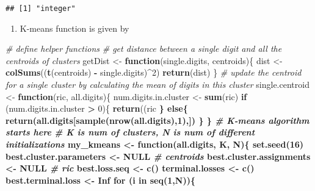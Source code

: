 \documentclass[]{article}
\newenvironment{Shaded}{\begin{snugshade}}{\end{snugshade}}
\newcommand{\KeywordTok}[1]{\textcolor[rgb]{0.13,0.29,0.53}{\textbf{#1}}}
\newcommand{\DecValTok}[1]{\textcolor[rgb]{0.00,0.00,0.81}{#1}}
\newcommand{\StringTok}[1]{\textcolor[rgb]{0.31,0.60,0.02}{#1}}
\newcommand{\CommentTok}[1]{\textcolor[rgb]{0.56,0.35,0.01}{\textit{#1}}}
\newcommand{\OtherTok}[1]{\textcolor[rgb]{0.56,0.35,0.01}{#1}}
\newcommand{\ControlFlowTok}[1]{\textcolor[rgb]{0.13,0.29,0.53}{\textbf{#1}}}
\newcommand{\OperatorTok}[1]{\textcolor[rgb]{0.81,0.36,0.00}{\textbf{#1}}}
\newcommand{\NormalTok}[1]{#1}
\providecommand{\tightlist}{%
  \setlength{\itemsep}{0pt}\setlength{\parskip}{0pt}}
\begin{document}
\begin{verbatim}
## [1] "integer"
\end{verbatim}

\begin{enumerate}
\def\labelenumi{\arabic{enumi}.}
\setcounter{enumi}{1}
\tightlist
\item
  K-means function is given by
\end{enumerate}

\begin{Shaded}
\begin{Highlighting}[]
\CommentTok{# define helper functions}
\CommentTok{# get distance between a single digit and all the centroids of clusters}
\NormalTok{getDist <-}\StringTok{ }\ControlFlowTok{function}\NormalTok{(single.digits, centroids)\{}
\NormalTok{  dist <-}\StringTok{ }\KeywordTok{colSums}\NormalTok{((}\KeywordTok{t}\NormalTok{(centroids) }\OperatorTok{-}\StringTok{ }\NormalTok{single.digits)}\OperatorTok{^}\DecValTok{2}\NormalTok{)}
  \KeywordTok{return}\NormalTok{(dist)}
\NormalTok{\}}
\CommentTok{# update the centroid for a single cluster by calculating the mean of digits in this cluster}
\NormalTok{single.centroid <-}\StringTok{ }\ControlFlowTok{function}\NormalTok{(ric, all.digits)\{}
\NormalTok{  num.digits.in.cluster <-}\StringTok{ }\KeywordTok{sum}\NormalTok{(ric)}
  \ControlFlowTok{if}\NormalTok{ (num.digits.in.cluster }\OperatorTok{>}\StringTok{ }\DecValTok{0}\NormalTok{)\{}
    \KeywordTok{return}\NormalTok{((ric }\OperatorTok{%*%}\StringTok{ }\NormalTok{all.digits) }\OperatorTok{/}\StringTok{ }\NormalTok{num.digits.in.cluster )}
\NormalTok{  \}}
  \ControlFlowTok{else}\NormalTok{\{}
    \KeywordTok{return}\NormalTok{(all.digits[}\KeywordTok{sample}\NormalTok{(}\KeywordTok{nrow}\NormalTok{(all.digits),}\DecValTok{1}\NormalTok{),])}
\NormalTok{  \}}
\NormalTok{\}}
\CommentTok{# K-means algorithm starts here }
\CommentTok{# K is num of clusters, N is num of different initializations}
\NormalTok{my_kmeans <-}\StringTok{ }\ControlFlowTok{function}\NormalTok{(all.digits, K, N)\{}
  \KeywordTok{set.seed}\NormalTok{(}\DecValTok{16}\NormalTok{)}
\NormalTok{  best.cluster.parameters <-}\StringTok{ }\OtherTok{NULL} \CommentTok{# centroids}
\NormalTok{  best.cluster.assignments <-}\StringTok{ }\OtherTok{NULL} \CommentTok{# ric}
\NormalTok{  best.loss.seq <-}\StringTok{ }\KeywordTok{c}\NormalTok{()}
\NormalTok{  terminal.losses <-}\StringTok{ }\KeywordTok{c}\NormalTok{()}
\NormalTok{  best.terminal.loss <-}\StringTok{ }\OtherTok{Inf}
  \ControlFlowTok{for}\NormalTok{ (i }\ControlFlowTok{in} \KeywordTok{seq}\NormalTok{(}\DecValTok{1}\NormalTok{,N))\{}
}
\end{Highlighting}
\end{Shaded}
\end{document}
